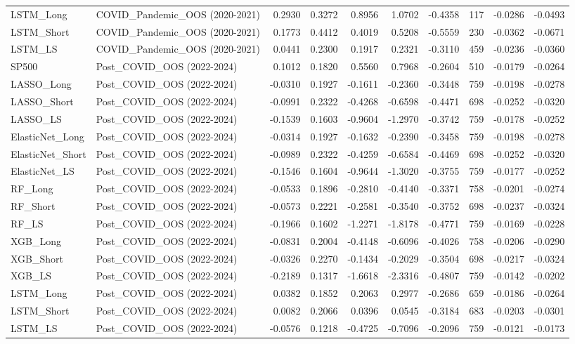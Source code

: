 \begin{tabular}{llrrrrrrrr}
\cline{1-10}
LSTM\_Long & COVID\_Pandemic\_OOS (2020-2021) & 0.2930 & 0.3272 & 0.8956 & 1.0702 & -0.4358 & 117 & -0.0286 & -0.0493 \\
\cline{1-10}
LSTM\_Short & COVID\_Pandemic\_OOS (2020-2021) & 0.1773 & 0.4412 & 0.4019 & 0.5208 & -0.5559 & 230 & -0.0362 & -0.0671 \\
\cline{1-10}
LSTM\_LS & COVID\_Pandemic\_OOS (2020-2021) & 0.0441 & 0.2300 & 0.1917 & 0.2321 & -0.3110 & 459 & -0.0236 & -0.0360 \\
\cline{1-10}
SP500 & Post\_COVID\_OOS (2022-2024) & 0.1012 & 0.1820 & 0.5560 & 0.7968 & -0.2604 & 510 & -0.0179 & -0.0264 \\
\cline{1-10}
LASSO\_Long & Post\_COVID\_OOS (2022-2024) & -0.0310 & 0.1927 & -0.1611 & -0.2360 & -0.3448 & 759 & -0.0198 & -0.0278 \\
\cline{1-10}
LASSO\_Short & Post\_COVID\_OOS (2022-2024) & -0.0991 & 0.2322 & -0.4268 & -0.6598 & -0.4471 & 698 & -0.0252 & -0.0320 \\
\cline{1-10}
LASSO\_LS & Post\_COVID\_OOS (2022-2024) & -0.1539 & 0.1603 & -0.9604 & -1.2970 & -0.3742 & 759 & -0.0178 & -0.0252 \\
\cline{1-10}
ElasticNet\_Long & Post\_COVID\_OOS (2022-2024) & -0.0314 & 0.1927 & -0.1632 & -0.2390 & -0.3458 & 759 & -0.0198 & -0.0278 \\
\cline{1-10}
ElasticNet\_Short & Post\_COVID\_OOS (2022-2024) & -0.0989 & 0.2322 & -0.4259 & -0.6584 & -0.4469 & 698 & -0.0252 & -0.0320 \\
\cline{1-10}
ElasticNet\_LS & Post\_COVID\_OOS (2022-2024) & -0.1546 & 0.1604 & -0.9644 & -1.3020 & -0.3755 & 759 & -0.0177 & -0.0252 \\
\cline{1-10}
RF\_Long & Post\_COVID\_OOS (2022-2024) & -0.0533 & 0.1896 & -0.2810 & -0.4140 & -0.3371 & 758 & -0.0201 & -0.0274 \\
\cline{1-10}
RF\_Short & Post\_COVID\_OOS (2022-2024) & -0.0573 & 0.2221 & -0.2581 & -0.3540 & -0.3752 & 698 & -0.0237 & -0.0324 \\
\cline{1-10}
RF\_LS & Post\_COVID\_OOS (2022-2024) & -0.1966 & 0.1602 & -1.2271 & -1.8178 & -0.4771 & 759 & -0.0169 & -0.0228 \\
\cline{1-10}
XGB\_Long & Post\_COVID\_OOS (2022-2024) & -0.0831 & 0.2004 & -0.4148 & -0.6096 & -0.4026 & 758 & -0.0206 & -0.0290 \\
\cline{1-10}
XGB\_Short & Post\_COVID\_OOS (2022-2024) & -0.0326 & 0.2270 & -0.1434 & -0.2029 & -0.3504 & 698 & -0.0217 & -0.0324 \\
\cline{1-10}
XGB\_LS & Post\_COVID\_OOS (2022-2024) & -0.2189 & 0.1317 & -1.6618 & -2.3316 & -0.4807 & 759 & -0.0142 & -0.0202 \\
\cline{1-10}
LSTM\_Long & Post\_COVID\_OOS (2022-2024) & 0.0382 & 0.1852 & 0.2063 & 0.2977 & -0.2686 & 659 & -0.0186 & -0.0264 \\
\cline{1-10}
LSTM\_Short & Post\_COVID\_OOS (2022-2024) & 0.0082 & 0.2066 & 0.0396 & 0.0545 & -0.3184 & 683 & -0.0203 & -0.0301 \\
\cline{1-10}
LSTM\_LS & Post\_COVID\_OOS (2022-2024) & -0.0576 & 0.1218 & -0.4725 & -0.7096 & -0.2096 & 759 & -0.0121 & -0.0173 \\
\cline{1-10}
\bottomrule
\end{tabular}
